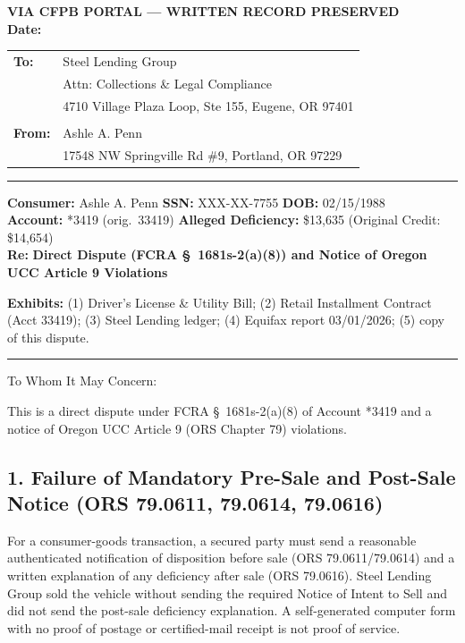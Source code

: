 \documentclass[12pt,letterpaper]{article}
\begin{document}
\begin{center}\textbf{VIA CFPB PORTAL --- WRITTEN RECORD PRESERVED}\\ \textbf{Date:} \underline{\hspace{3cm}}\end{center}

\begin{tabular}{@{}ll}
  \textbf{To:} & Steel Lending Group \\ & Attn: Collections \& Legal Compliance \\ & 4710 Village Plaza Loop, Ste 155, Eugene, OR 97401 \\ & \\
  \textbf{From:} & Ashle A. Penn \\ & 17548 NW Springville Rd \#9, Portland, OR 97229 \\
\end{tabular}

\vspace{1em}\hrule\vspace{1em}
\textbf{Consumer:} Ashle A. Penn \quad \textbf{SSN:} XXX-XX-7755 \quad \textbf{DOB:} 02/15/1988 \\
\textbf{Account:} *3419 (orig.\ 33419) \quad \textbf{Alleged Deficiency:} \$13,635 (Original Credit: \$14,654) \\
\textbf{Re:} \textbf{Direct Dispute (FCRA \S~1681s-2(a)(8)) and Notice of Oregon UCC Article 9 Violations}

\vspace{1em}\textbf{Exhibits:} (1) Driver's License \& Utility Bill; (2) Retail Installment Contract (Acct 33419); (3) Steel Lending ledger; (4) Equifax report 03/01/2026; (5) copy of this dispute.
\vspace{1em}\hrule\vspace{1em}

To Whom It May Concern:

This is a direct dispute under FCRA \S~1681s-2(a)(8) of Account *3419 and a notice of Oregon UCC Article 9 (ORS Chapter 79) violations.

\subsection*{1. Failure of Mandatory Pre-Sale and Post-Sale Notice (ORS 79.0611, 79.0614, 79.0616)}
For a consumer-goods transaction, a secured party must send a reasonable authenticated notification of disposition before sale (ORS 79.0611/79.0614) and a written explanation of any deficiency after sale (ORS 79.0616). Steel Lending Group sold the vehicle without sending the required Notice of Intent to Sell and did not send the post-sale deficiency explanation. A self-generated computer form with no proof of postage or certified-mail receipt is not proof of service.
\end{document}
